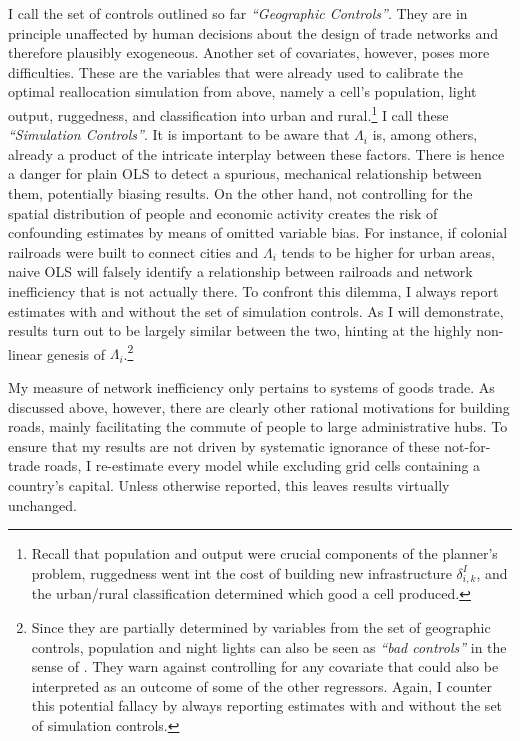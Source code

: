 \documentclass[11pt, oneside]{article}   	%
\begin{document}
I call the set of controls outlined so far \emph{``Geographic Controls''}. They are in principle unaffected by human decisions about the design of trade networks and therefore plausibly exogeneous. Another set of covariates, however, poses more difficulties. These are the variables that were already used to calibrate the optimal reallocation simulation from above, namely a cell's population, light output, ruggedness, and classification into urban and rural.\footnote{Recall that population and output were crucial components of the planner's problem, ruggedness went int the cost of building new infrastructure $\delta^{I}_{i,k}$, and the urban/rural classification determined which good a cell produced.} I call these \emph{``Simulation Controls''}. It is important to be aware that $\Lambda_{i}$ is, among others, already a product of the intricate interplay between these factors. There is hence a danger for plain OLS to detect a spurious, mechanical relationship between them, potentially biasing results. On the other hand, not controlling for the spatial distribution of people and economic activity creates the risk of confounding estimates by means of omitted variable bias. For instance, if colonial railroads were built to connect cities and $\Lambda_{i}$ tends to be higher for urban areas, naive OLS will falsely identify a relationship between railroads and network inefficiency that is not actually there. To confront this dilemma, I always report estimates with and without the set of simulation controls. As I will demonstrate, results turn out to be largely similar between the two, hinting at the highly non-linear genesis of $\Lambda_{i}$.\footnote{Since they are partially determined by variables from the set of geographic controls, population and night lights can also be seen as \emph{``bad controls''} in the sense of \cite{Angrist_MostlyHarmlessEconometrics_2008}. They warn against controlling for any covariate that could also be interpreted as an outcome of some of the other regressors. Again, I counter this potential fallacy by always reporting estimates with and without the set of simulation controls.}

My measure of network inefficiency only pertains to systems of goods trade. As discussed above, however, there are clearly other rational motivations for building roads, mainly facilitating the commute of people to large administrative hubs. To ensure that my results are not driven by systematic ignorance of these not-for-trade roads, I re-estimate every model while excluding grid cells containing a country's capital. Unless otherwise reported, this leaves results virtually unchanged.
\end{document}
